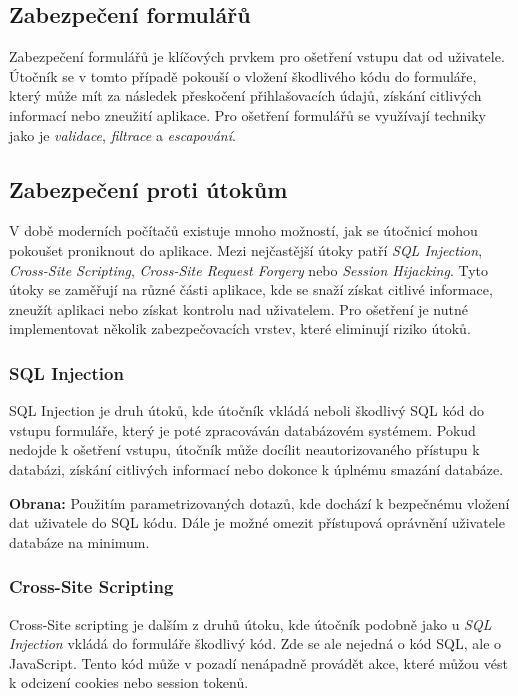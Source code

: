 \subsection{Zabezpečení formulářů}
\label{subsec:security-forms}
Zabezpečení formulářů je klíčových prvkem pro ošetření vstupu dat od uživatele. Útočník se v tomto případě pokouší o vložení škodlivého kódu do formuláře, který může mít za následek přeskočení přihlašovacích údajů, získání citlivých informací nebo zneužití aplikace. Pro ošetření formulářů se využívají techniky jako je \textit{validace}, \textit{filtrace} a \textit{escapování}.

\subsection{Zabezpečení proti útokům}
\label{subsec:security-attacks}
V době moderních počítačů existuje mnoho možností, jak se útočnicí mohou pokoušet proniknout do aplikace. Mezi nejčastější útoky patří \textit{SQL Injection}, \textit{Cross-Site Scripting}, \textit{Cross-Site Request Forgery} nebo \textit{Session Hijacking}. Tyto útoky se zaměřují na různé části aplikace, kde se snaží získat citlivé informace, zneužít aplikaci nebo získat kontrolu nad uživatelem. Pro ošetření je nutné implementovat několik zabezpečovacích vrstev, které eliminují riziko útoků.

\subsubsection*{SQL Injection}
\label{subsubsec:security-attacks-sql-injection}
SQL Injection je druh útoků, kde útočník vkládá neboli  škodlivý SQL kód do vstupu formuláře, který je poté zpracováván databázovém systémem. Pokud nedojde k ošetření vstupu, útočník může docílit neautorizovaného přístupu k databázi, získání citlivých informací nebo dokonce k úplnému smazání databáze.

\textbf{Obrana:} Použitím parametrizovaných dotazů, kde dochází k bezpečnému vložení dat uživatele do SQL kódu. Dále je možné omezit přístupová oprávnění uživatele databáze na minimum.

\subsubsection*{Cross-Site Scripting}
\label{subsubsec:security-attacks-cross-site-scripting}
Cross-Site scripting je dalším z druhů útoku, kde útočník podobně jako u \textit{SQL Injection} vkládá do formuláře škodlivý kód. Zde se ale nejedná o kód SQL, ale o JavaScript. Tento kód může v pozadí nenápadně provádět akce, které můžou vést k odcizení cookies nebo session tokenů.


